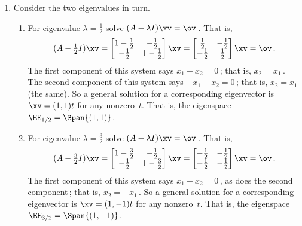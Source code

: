 \begin{example}
\begin{solution}
\begin{enumerate}
\item Consider the two eigenvalues in turn.
\begin{enumerate}
\item For eigenvalue \(\lambda=\frac12\) solve \((A-\lambda I)\xv=\ov\)\,.  That is,
\begin{equation*}
(A-\tfrac12I)\xv
=\begin{bmatrix} 1-\frac12&-\frac12\\
-\frac12&1-\frac12 \end{bmatrix}\xv
=\begin{bmatrix} \frac12&-\frac12\\
-\frac12&\frac12 \end{bmatrix}\xv
=\ov\,.
\end{equation*}
The first component of this system says \(x_1-x_2=0\)\,; that is, \(x_2=x_1\)\,.  
The second component of this system says \(-x_1+x_2=0\)\,; that is, \(x_2=x_1\) (the same).  
So a general solution for a corresponding eigenvector is \(\xv=(1,1)t\) for any nonzero~\(t\).
That is, the eigenspace \(\EE_{1/2}=\Span \{(1,1)\}\).
\item For eigenvalue \(\lambda=\frac32\) solve \((A-\lambda I)\xv=\ov\)\,.  That is,
\begin{equation*}
(A-\tfrac32I)\xv
=\begin{bmatrix} 1-\frac32&-\frac12\\
-\frac12&1-\frac32 \end{bmatrix}\xv
=\begin{bmatrix} -\frac12&-\frac12\\
-\frac12&-\frac12 \end{bmatrix}\xv
=\ov\,.
\end{equation*}
The first component of this system says \(x_1+x_2=0\)\,, as does the second component\,; that is, \(x_2=-x_1\)\,.  
So a general solution for a corresponding eigenvector is \(\xv=(1,-1)t\) for any nonzero~\(t\).
That is, the eigenspace \(\EE_{3/2}=\Span \{(1,-1)\}\).
\end{enumerate}
\end{enumerate}
\end{solution}
\end{example}



